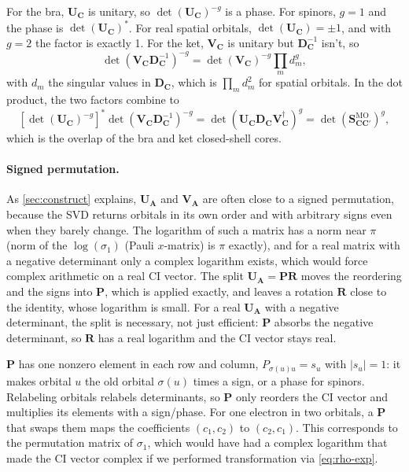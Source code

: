 \documentclass[aip,jcp,preprint]{revtex4-1}
\newcommand{\bvec}[1]{\mathbf{#1}}
\newcommand{\SMO}{\bvec{S}^{\mathrm{MO}}}
\begin{document}
For the bra, $\bvec{U}_{\bvec{C}}$ is unitary, so $\det(\bvec{U}_{\bvec{C}})^{-g}$ is a phase.
For spinors, $g = 1$ and the phase is $\det(\bvec{U}_{\bvec{C}})^*$.
For real spatial orbitals, $\det(\bvec{U}_{\bvec{C}}) = \pm1$, and with $g = 2$ the factor is exactly 1.
For the ket, $\bvec{V}_{\bvec{C}}$ is unitary but $\bvec{D}_{\bvec{C}}^{-1}$ isn't, so
\begin{equation}
 \det(\bvec{V}_{\bvec{C}}\bvec{D}_{\bvec{C}}^{-1})^{-g}
 = \det(\bvec{V}_{\bvec{C}})^{-g}\prod_m d_m^{g},
\end{equation}
with $d_m$ the singular values in $\bvec{D}_{\bvec{C}}$, which is $\prod_m d_m^2$ for spatial orbitals.
In the dot product, the two factors combine to
\begin{equation}
 \left[\det(\bvec{U}_{\bvec{C}})^{-g}\right]^*
 \det(\bvec{V}_{\bvec{C}}\bvec{D}_{\bvec{C}}^{-1})^{-g}
 = \det(\bvec{U}_{\bvec{C}}\bvec{D}_{\bvec{C}}\bvec{V}_{\bvec{C}}^\dagger)^{g}
 = \det(\SMO_{\bvec{C}\bvec{C}'})^{g},
\end{equation}
which is the overlap of the bra and ket closed-shell cores.

\paragraph{Signed permutation.}
As \cref{sec:construct} explains, $\bvec{U}_{\bvec{A}}$ and $\bvec{V}_{\bvec{A}}$ are often close to a signed permutation, because the SVD returns orbitals in its own order and with arbitrary signs even when they barely change.
The logarithm of such a matrix has a norm near $\pi$ (norm of the $\log(\sigma_1)$ (Pauli $x$-matrix) is $\pi$ exactly), and for a real matrix with a negative determinant only a complex logarithm exists, which would force complex arithmetic on a real CI vector.
The split $\bvec{U}_{\bvec{A}} = \bvec{P}\bvec{R}$ moves the reordering and the signs into $\bvec{P}$, which is applied exactly, and leaves a rotation $\bvec{R}$ close to the identity, whose logarithm is small.
For a real $\bvec{U}_{\bvec{A}}$ with a negative determinant, the split is necessary, not just efficient: $\bvec{P}$ absorbs the negative determinant, so $\bvec{R}$ has a real logarithm and the CI vector stays real.

$\bvec{P}$ has one nonzero element in each row and column, $P_{\sigma(u)u} = s_u$ with $|s_u| = 1$: it makes orbital $u$ the old orbital $\sigma(u)$ times a sign, or a phase for spinors.
Relabeling orbitals relabels determinants, so $\bvec{P}$ only reorders the CI vector and multiplies its elements with a sign/phase.
For one electron in two orbitals, a $\bvec{P}$ that swaps them maps the coefficients $(c_1, c_2)$ to $(c_2, c_1)$.
This corresponds to the permutation matrix of $\sigma_1$, which would have had a complex logarithm that made the CI vector complex if we performed transformation via \cref{eq:rho-exp}.
\end{document}
